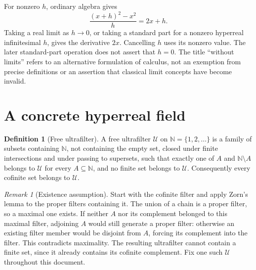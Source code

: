 \documentclass[11pt]{article}
\theoremstyle{definition}
\newtheorem{definition}[theorem]{Definition}
\theoremstyle{remark}
\newtheorem{remark}[theorem]{Remark}
\newcommand{\NN}{\mathbb N}
\newcommand{\U}{\mathcal U}
\begin{document}
For nonzero \(h\), ordinary algebra gives
\[
\frac{(x+h)^2-x^2}{h}=2x+h.
\]
Taking a real limit as \(h\to0\), or taking a standard part for a nonzero
hyperreal infinitesimal \(h\), gives the derivative \(2x\). Cancelling \(h\)
uses its nonzero value. The later standard-part operation does not assert
that \(h=0\). The title ``without limits'' refers to an alternative formulation
of calculus, not an exemption from precise definitions or an assertion that
classical limit concepts have become invalid.

\section{A concrete hyperreal field}
\begin{definition}[Free ultrafilter]\label{def:ultrafilter}
A free ultrafilter \(\U\) on \(\NN=\{1,2,\ldots\}\) is a family of subsets
containing \(\NN\), not containing the empty set, closed under finite intersections
and under passing to supersets, such that exactly one of \(A\) and
\(\NN\setminus A\) belongs to \(\U\) for every \(A\subseteq\NN\), and no
finite set belongs to \(\U\). Consequently every cofinite set belongs to \(\U\).
\end{definition}
\begin{remark}[Existence assumption]\label{rem:choice}
Start with the cofinite filter and apply Zorn's lemma to the proper filters
containing it. The union of a chain is a proper filter, so a maximal one exists.
If neither \(A\) nor its complement belonged to this maximal filter, adjoining
\(A\) would still generate a proper filter: otherwise an existing filter member
would be disjoint from \(A\), forcing its complement into the filter.
This contradicts maximality. The resulting ultrafilter cannot contain a finite
set, since it already contains its cofinite complement.
Fix one such \(\U\) throughout this document.
\end{remark}
\end{document}
